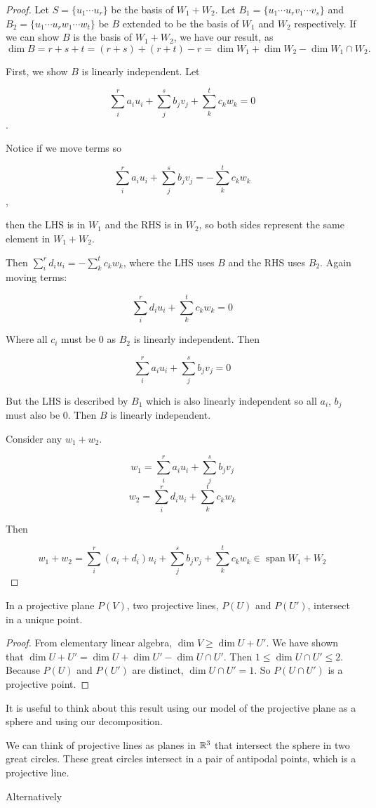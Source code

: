 \documentclass[10pt]{article}
\begin{document}
\begin{proof}
	Let $S = \{ u_1 \cdots u_r \}$ be the basis of $W_1 + W_2$. Let $B_1 = \{ u_1 \cdots u_r v_1 \cdots v_s \}$ and $B_2 = \{ u_1 \cdots u_r w_1 \cdots w_t \}$ be $B$ extended to be the basis of $W_1$ and $W_2$ respectively. 
	If we can show $B$ is the basis of $W_1 + W_2$, we have our result, as $\dim B = r + s + t = (r + s) + (r + t) - r = \dim W_1 + \dim W_2 - \dim W_1 \cap W_2.$

	First, we show $B$ is linearly independent. Let 

	\[\sum_i^r{a_iu_i} + \sum_j^s{b_jv_j} + \sum_k^t{c_kw_k} = 0\]. 

	Notice if we move terms so 

	\[\sum_i^r{a_iu_i} + \sum_j^s{b_jv_j} = -\sum_k^t{c_kw_k}\], 

	then the LHS is in $W_1$ and the RHS is in $W_2$, so both sides represent the same element in $W_1 + W_2$. 

	Then $\sum_i^r{d_iu_i} = -\sum_k^t{c_kw_k}$, where the LHS uses $B$ and the RHS uses $B_2$. Again moving terms:

	\[\sum_i^r{d_iu_i} + \sum_k^t{c_kw_k} = 0\]

	Where all $c_i$ must be 0 as $B_2$ is linearly independent. Then

	\[\sum_i^r{a_iu_i} + \sum_j^s{b_jv_j} = 0\]

	But the LHS is described by $B_1$ which is also linearly independent so all $a_i$, $b_j$ must also be 0. Then $B$ is linearly independent.

	Consider any $w_1 + w_2$. 

	\[w_1 = \sum_i^r{a_iu_i} + \sum_j^s{b_jv_j}\]
	\[w_2 = \sum_i^r{d_iu_i} + \sum_k^t{c_kw_k}\]

	Then

	\[w_1 + w_2 = \sum_i^r{(a_i + d_i) u_i} + \sum_j^s{b_jv_j} + \sum_k^t{c_kw_k} \in \operatorname{span} W_1 + W_2 \]

\end{proof}

\begin{theorem}
	In a projective plane $P(V)$, two projective lines, $P(U)$ and $P(U')$, intersect in a unique point.
\end{theorem}
\begin{proof}
	From elementary linear algebra, $\dim V \geq \dim U + U'$. We have shown that $\dim U + U' = \dim U + \dim U' - \dim {U \cap U'}$.
	Then $1 \leq \dim {U \cap U'} \leq 2$. Because $P(U)$ and $P(U')$ are distinct, $\dim {U \cap U'} = 1$. So $P(U \cap U')$ is a projective point.
\end{proof}

It is useful to think about this result using our model of the projective plane as a sphere and using our decomposition.

We can think of projective lines as planes in $\mathbb{R}^3$ that intersect the sphere
in two great circles. These great circles intersect in a pair of antipodal
points, which is a projective line.

Alternatively
\end{document}
